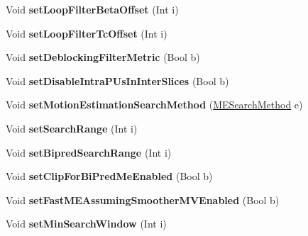 \begin{DoxyCompactItemize}
\item 
\mbox{\label{class_t_enc_cfg_a44a1e7bd91f316ae8b34100f8b812fe4}} 
Void {\bfseries set\+Loop\+Filter\+Beta\+Offset} (Int i)
\item 
\mbox{\label{class_t_enc_cfg_a27d3bdf7c3cb924b696657416b85629e}} 
Void {\bfseries set\+Loop\+Filter\+Tc\+Offset} (Int i)
\item 
\mbox{\label{class_t_enc_cfg_aa89d5be9172e9fcd600602a7ae3b4701}} 
Void {\bfseries set\+Deblocking\+Filter\+Metric} (Bool b)
\item 
\mbox{\label{class_t_enc_cfg_a0ad59f88aee2c798a2c49e7a3fea90cb}} 
Void {\bfseries set\+Disable\+Intra\+P\+Us\+In\+Inter\+Slices} (Bool b)
\item 
\mbox{\label{class_t_enc_cfg_a7e434b01543628d0ba29dd09e4b3d40f}} 
Void {\bfseries set\+Motion\+Estimation\+Search\+Method} (\hyperlink{_type_def_8h_a8aca966885e6dbeca4cabfc3530a9bde}{M\+E\+Search\+Method} e)
\item 
\mbox{\label{class_t_enc_cfg_a5106b4cc01131dfc9079b645ad1b4148}} 
Void {\bfseries set\+Search\+Range} (Int i)
\item 
\mbox{\label{class_t_enc_cfg_a1542c0fadadf5cfae9068c256ac6bfc3}} 
Void {\bfseries set\+Bipred\+Search\+Range} (Int i)
\item 
\mbox{\label{class_t_enc_cfg_a63194839e27285cde82c76b038febe2b}} 
Void {\bfseries set\+Clip\+For\+Bi\+Pred\+Me\+Enabled} (Bool b)
\item 
\mbox{\label{class_t_enc_cfg_a86289221b89d196c123711bf83487fdf}} 
Void {\bfseries set\+Fast\+M\+E\+Assuming\+Smoother\+M\+V\+Enabled} (Bool b)
\item 
\mbox{\label{class_t_enc_cfg_a0fba92f03aa5a5c0ef2a42ea9eb0a2b5}} 
Void {\bfseries set\+Min\+Search\+Window} (Int i)
\item 
\mbox{\label{class_t_enc_cfg_a7d36ce3e6fa268656df339fa603eeb1c}} 

\end{DoxyCompactItemize}
